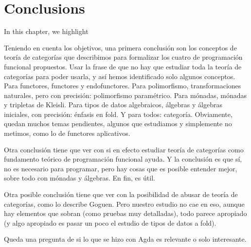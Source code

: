 \chapter{Conclusions}
\label{chap:conclusions}

\begin{epigraphs}
\end{epigraphs}

In this chapter, we highlight

Teniendo en cuenta los objetivos, una primera conclusión son los
conceptos de teoría de categorías que describimos para formalizar los
cuatro de programación funcional propuestos. Usar la frase de que no
hay que estudiar toda la teoría de categorías para poder usarla, y así
hemos identificado solo algunos conceptos. Para functores, functores y
endofunctores. Para polimorfismo, transformaciones naturales, pero con
precisión: polimorfismo paramétrico. Para mónadas, mónadas y tripletas
de Kleisli. Para tipos de datos algebraicos, álgebras y álgebras
iniciales, con precisión: énfasis en fold. Y para todos: categoría.
Obviamente, quedan muchos temas pendientes, algunos que estudiamos y
simplemente no metimos, como lo de functores aplicativos.

Otra conclusión tiene que ver con si en efecto estudiar teoría de
categorías como fundamento teórico de programación funcional ayuda. Y
la conclusión es que sí, no es necesario para programar, pero hay
cosas que es posible entender mejor, sobre todo con mónadas y
álgebras. En fin, es útil.

Otra posible conclusión tiene que ver con la posibilidad de abusar de
teoría de categorías, como lo describe Goguen. Pero nuestro estudio no
cae en eso, aunque hay elementos que sobran (como pruebas muy
detalladas), todo parece apropiado (y algo apropiado es pasar un poco
el estudio de tipos de datos a fold).

Queda una pregunta de si lo que se hizo con Agda es relevante o solo
interesante.






